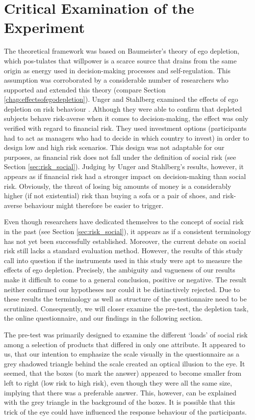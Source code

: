 \section{Critical Examination of the Experiment}
The theoretical framework was based on Baumeister’s theory of ego depletion, which pos-tulates that willpower is a scarce source that drains from the same origin as energy used in decision-making processes and self-regulation. This assumption was corroborated by a considerable number of researchers who supported and extended this theory (compare Section \ref{chap:effectsofegodepletion}). Unger and Stahlberg examined the effects of ego depletion on risk behaviour \citep{unger2011ego}. Although they were able to confirm that depleted subjects behave risk-averse when it comes to decision-making, the effect was only verified with regard to financial risk. They used investment options (participants had to act as managers who had to decide in which country to invest) in order to design low and high risk scenarios. This design was not adaptable for our purposes, as financial risk does not fall under the definition of social risk (see Section \ref{sec:risk_social}). Judging by Unger and Stahlberg’s results, however, it appears as if financial risk had a stronger impact on decision-making than social risk. Obviously, the threat of losing big amounts of money is a considerably higher (if not existential) risk than buying a sofa or a pair of shoes, and risk-averse behaviour might therefore be easier to trigger.\par
Even though researchers have dedicated themselves to the concept of social risk in the past (see Section \ref{sec:risk_social}), it appears as if a consistent terminology has not yet been successfully established. Moreover, the current debate on social risk still lacks a standard evaluation method. However, the results of this study call into question if the instruments used in this study were apt to measure the effects of ego depletion. Precisely, the ambiguity and vagueness of our results make it difficult to come to a general conclusion, positive or negative. The result neither confirmed our hypotheses nor could it be distinctively rejected.  Due to these results the terminology as well as structure of the questionnaire need to be scrutinized. Consequently, we will closer examine the pre-test, the depletion task, the online questionnaire, and our findings in the following section.\par
The pre-test was primarily designed to examine the different ‘loads’ of social risk among a selection of products that differed in only one attribute. It appeared to us, that our intention to emphasize the scale visually in the questionnaire as a grey shadowed triangle behind the scale created an optical illusion to the eye. It seemed, that the boxes (to mark the answer) appeared to become smaller from left to right (low risk to high risk), even though they were all the same size, implying that there was a preferable answer. This, however, can be explained with the grey triangle in the background of the boxes. It is possible that this trick of the eye could have influenced the response behaviour of the participants. \par

